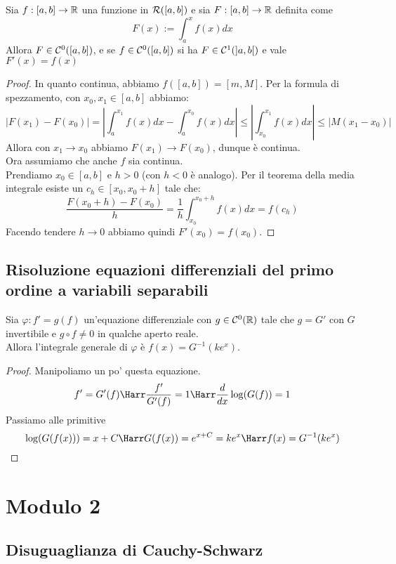 \documentclass{article}
\begin{document}
\begin{theorem}{}{}
    Sia $f:[a,b] \to \mathbb{R}$ una funzione in $\mathcal{R}([a,b])$ e sia $F: [a,b]\to \mathbb{R}$ definita come
    \[F(x) := \int_a^x f(x) d x\]
    Allora $F \in \mathcal{C}^0([a,b])$, e se $f \in \mathcal{C}^0([a,b])$ si ha $F \in \mathcal{C}^1(]a,b[)$ e vale $F'(x)=f(x)$
\end{theorem}
\begin{proof}
    In quanto continua, abbiamo $f([a,b]) = [m,M]$. Per la formula di spezzamento, con $x_0, x_1 \in [a,b]$ abbiamo:
    \[|F(x_1) - F(x_0)| = \left|\int_a^{x_1} f(x)dx - \int_a^{x_0} f(x)dx\right| \le \left| \int_{x_0}^{x_1} f(x)dx\right| \le |M(x_1-x_0)|\]
    Allora con $x_1 \to x_0$ abbiamo $F(x_1)\to F(x_0)$, dunque è continua.\\
    Ora assumiamo che anche $f$ sia continua.\\
    Prendiamo $x_0 \in [a,b]$ e $h > 0$ (con $h<0$ è analogo). Per il teorema della media integrale esiste un $c_h \in [x_0, x_0 + h]$ tale che:
    \[\frac{F(x_0+h) - F(x_0)}{h} = \frac{1}{h} \int_{x_0}^{x_0+h}f(x)dx = f(c_h)\]
    Facendo tendere $h\to 0$ abbiamo quindi $F'(x_0) = f(x_0)$.
\end{proof}

\subsection{Risoluzione equazioni differenziali del primo ordine a variabili separabili}

\begin{theorem}{}{}
    Sia $\varphi:f'= g(f)$ un'equazione differenziale con $g \in \mathcal{C}^0(\mathbb{R})$ tale che $g = G'$ con $G$ invertibile e $g\circ f \neq 0$ in qualche aperto reale.\\
    Allora l'integrale generale di $\varphi$ è $f(x) = G^{-1}(ke^x)$.
\end{theorem}
\begin{proof}
    Manipoliamo un po' questa equazione.
    \[f' = G'(f) \Harr \frac{f'}{G'(f)} = 1 \Harr \frac{d}{dx}\log (G(f)) = 1 \]
    Passiamo alle primitive 
    \[\log (G(f(x))) = x +C \Harr G(f(x)) = e^{x+C} = k e^x \Harr f(x) = G^{-1}(ke^x)\]
\end{proof}

\section{Modulo 2}

\subsection{Disuguaglianza di Cauchy-Schwarz}
\end{document}
